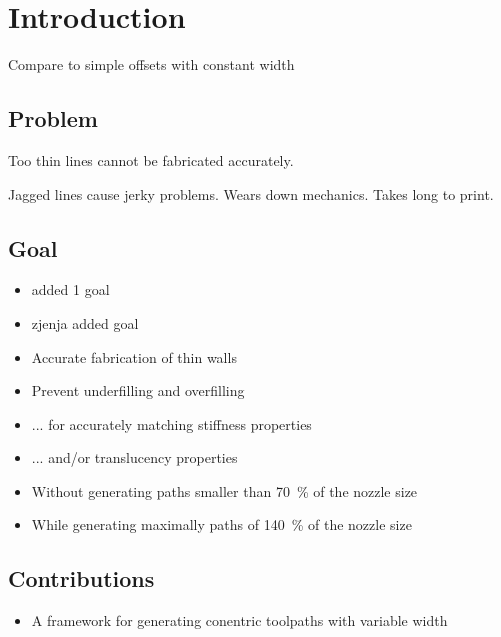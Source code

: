 \section{Introduction}

Compare to simple offsets with constant width

\subsection{Problem}
Too thin lines cannot be fabricated accurately.

Jagged lines cause jerky problems.
Wears down mechanics.
Takes long to print.



\subsection{Goal}
\begin{itemize}
\item added 1 goal
\item zjenja added goal
\item Accurate fabrication of thin walls
\item Prevent underfilling and overfilling
\item ... for accurately matching stiffness properties
\item ... and/or translucency properties
\item Without generating paths smaller than \SI{70}{\percent} of the nozzle size
\item While generating maximally paths of \SI{140}{\percent} of the nozzle size
\end{itemize}



\subsection{Contributions}
\begin{itemize}
\item A framework for generating conentric toolpaths with variable width
\end{itemize}

